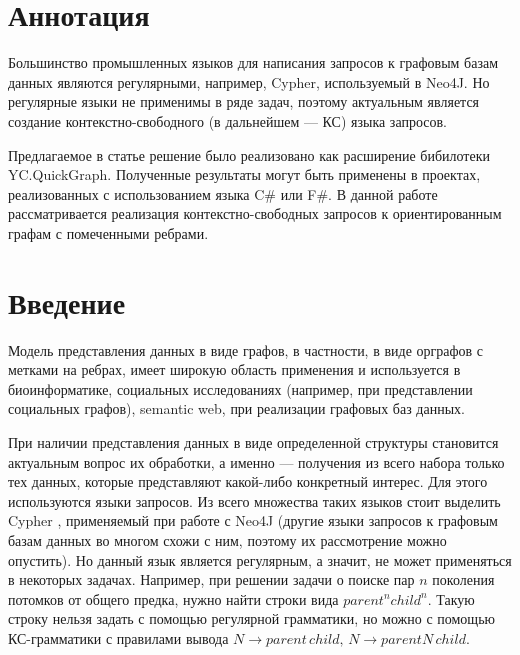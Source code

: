 \documentclass[14pt]{matmex-diploma-custom}
\begin{document}
\maketitle
\tableofcontents
\section*{Аннотация}
	Большинство промышленных языков для написания запросов к графовым базам данных являются регулярными, например, Cypher, используемый в Neo4J. Но регулярные языки не применимы в ряде задач, поэтому актуальным является создание контекстно-свободного (в дальнейшем --- КС) языка запросов.		

	Предлагаемое в статье решение было реализовано как расширение бибилотеки YC.QuickGraph. Полученные результаты могут быть применены в проектах, реализованных с использованием языка C\# или F\#. В данной работе рассматривается реализация контекстно-свободных запросов к ориентированным графам с помеченными ребрами.

\section*{Введение}
	Модель представления данных в виде графов, в частности, в виде орграфов с метками на ребрах, имеет широкую область применения и используется в биоинформатике, социальных исследованиях (например, при представлении социальных графов), semantic web, при реализации графовых баз данных. 
	
	При наличии представления данных в виде определенной структуры становится актуальным вопрос их обработки, а именно --- получения из всего набора только тех данных, которые представляют какой-либо конкретный интерес. Для этого используются языки запросов. Из всего множества таких языков стоит выделить Cypher \cite{Cypher}, применяемый при работе с Neo4J (другие языки запросов к графовым базам данных во многом схожи с ним, поэтому их рассмотрение можно опустить). Но данный язык является регулярным, а значит, не может применяться в некоторых задачах. Например, при решении задачи о поиске пар \(n\) поколения потомков от общего предка, нужно найти строки вида \(parent^nchild^n\). Такую строку нельзя задать с помощью регулярной грамматики, но можно с помощью КС-грамматики с правилами вывода \(N \to parent\,child, \,N \to parentN\, child\). 
	
\end{document}
